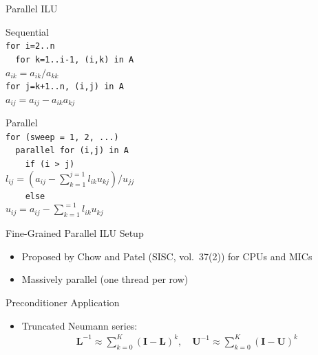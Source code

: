 \documentclass[usepdftitle=false,handout,10pt]{beamer}
\begin{document}
\begin{frame}[fragile]{Parallel ILU}

\begin{minipage}{0.45\textwidth}
  Sequential \\
  \lstinline|for i=2..n| \\
  \lstinline|  for k=1..i-1, (i,k) in A| \\
  \hspace*{0.7cm}$a_{ik} =  a_{ik}/a_{kk}$ \\
  \hspace*{0.7cm}\lstinline|for j=k+1..n, (i,j) in A| \\
  \hspace*{1cm}$a_{ij} =  a_{ij} - a_{ik}a_{kj}$ \\
\end{minipage} \hfill
\begin{minipage}{0.5\textwidth}
  Parallel \\
  \lstinline|for (sweep = 1, 2, ...)| \\
  \lstinline|  parallel for (i,j) in A| \\
  \lstinline|    if (i > j)| \\ 
  \hspace*{1cm}$l_{ij} =  (a_{ij} - \sum_{k=1}^{j=1} l_{ik}u_{kj}) / u_{jj}$ \\
  \lstinline|    else| \\
  \hspace*{1cm}$u_{ij} =  a_{ij} - \sum_{k=1}^{=1} l_{ik}u_{kj}$
\end{minipage}


  \begin{block}{Fine-Grained Parallel ILU Setup}
   \begin{itemize}
    \item Proposed by Chow and Patel (SISC, vol.~37(2)) for CPUs and MICs
    \item Massively parallel (one thread per row)
   \end{itemize}
  \end{block}
  
  \pause
  
  \begin{block}{Preconditioner Application}
   \begin{itemize}
    \item Truncated Neumann series:
     \begin{align*} \mathbf{L}^{-1} \approx \sum_{k=0}^K (\mathbf{I} - \mathbf{L})^k, \quad \mathbf{U}^{-1} \approx \sum_{k=0}^K (\mathbf{I} - \mathbf{U})^k \end{align*}
   \end{itemize}
  \end{block}

\end{frame}
\end{document}
